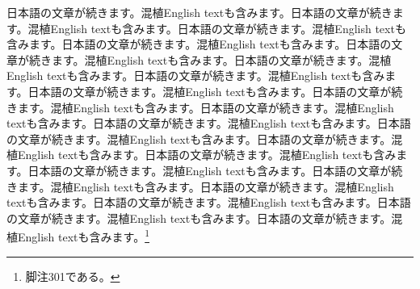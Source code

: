 \documentclass[pdflatex,book]{jlreq}
\begin{document}
日本語の文章が続きます。混植English textも含みます。日本語の文章が続きます。混植English textも含みます。日本語の文章が続きます。混植English textも含みます。日本語の文章が続きます。混植English textも含みます。日本語の文章が続きます。混植English textも含みます。日本語の文章が続きます。混植English textも含みます。日本語の文章が続きます。混植English textも含みます。日本語の文章が続きます。混植English textも含みます。日本語の文章が続きます。混植English textも含みます。日本語の文章が続きます。混植English textも含みます。日本語の文章が続きます。混植English textも含みます。日本語の文章が続きます。混植English textも含みます。日本語の文章が続きます。混植English textも含みます。日本語の文章が続きます。混植English textも含みます。日本語の文章が続きます。混植English textも含みます。日本語の文章が続きます。混植English textも含みます。日本語の文章が続きます。混植English textも含みます。日本語の文章が続きます。混植English textも含みます。日本語の文章が続きます。混植English textも含みます。日本語の文章が続きます。混植English textも含みます。\footnote{脚注301である。}
\end{document}
